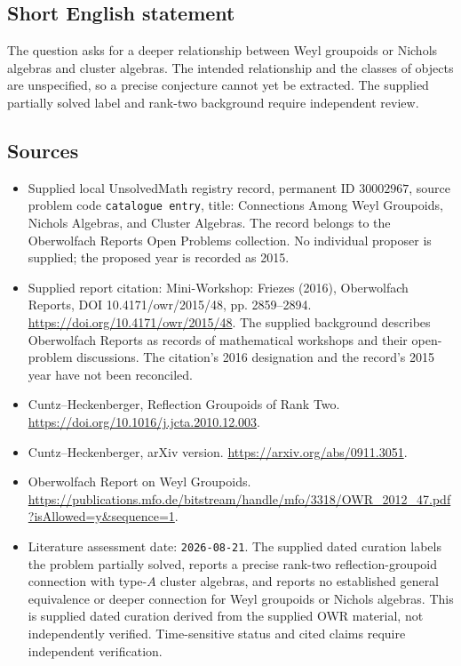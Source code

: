 \documentclass[11pt]{article}
\begin{document}
\subsection{Short English statement}
The question asks for a deeper relationship between Weyl groupoids or Nichols algebras and cluster algebras. The intended relationship and the classes of objects are unspecified, so a precise conjecture cannot yet be extracted. The supplied partially solved label and rank-two background require independent review.
\subsection{Sources}
\begin{itemize}
\item Supplied local UnsolvedMath registry record, permanent ID \(30002967\), source problem code \texttt{catalogue entry}, title: Connections Among Weyl Groupoids, Nichols Algebras, and Cluster Algebras. The record belongs to the Oberwolfach Reports Open Problems collection. No individual proposer is supplied; the proposed year is recorded as 2015.
\item Supplied report citation: Mini-Workshop: Friezes (2016), Oberwolfach Reports, DOI 10.4171/owr/2015/48, pp. 2859--2894. \url{https://doi.org/10.4171/owr/2015/48}. The supplied background describes Oberwolfach Reports as records of mathematical workshops and their open-problem discussions. The citation's 2016 designation and the record's 2015 year have not been reconciled.
\item Cuntz--Heckenberger, Reflection Groupoids of Rank Two. \url{https://doi.org/10.1016/j.jcta.2010.12.003}.
\item Cuntz--Heckenberger, arXiv version. \url{https://arxiv.org/abs/0911.3051}.
\item Oberwolfach Report on Weyl Groupoids. \url{https://publications.mfo.de/bitstream/handle/mfo/3318/OWR_2012_47.pdf?isAllowed=y&sequence=1}.
\item Literature assessment date: \texttt{2026-08-21}. The supplied dated curation labels the problem partially solved, reports a precise rank-two reflection-groupoid connection with type-\(A\) cluster algebras, and reports no established general equivalence or deeper connection for Weyl groupoids or Nichols algebras. This is supplied dated curation derived from the supplied OWR material, not independently verified. Time-sensitive status and cited claims require independent verification.
\end{itemize}
\end{document}
